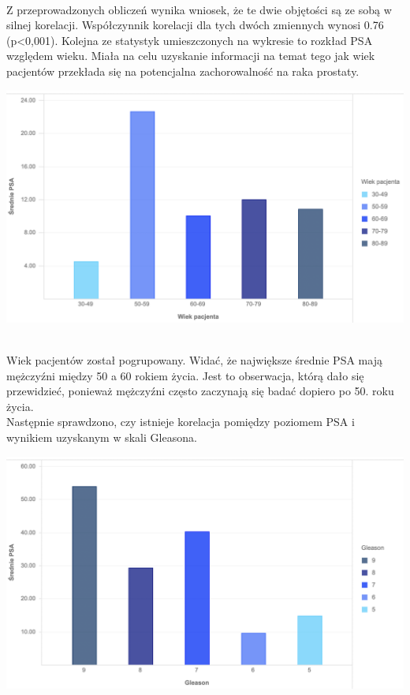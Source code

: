 \documentclass[a4paper,11pt,twoside]{report}
\theoremstyle{definition}
\begin{document}
\\ \newline
Z przeprowadzonych obliczeń wynika wniosek, że te dwie objętości są ze sobą w silnej korelacji. Współczynnik korelacji dla tych dwóch zmiennych wynosi 0.76 (p<0,001).
\newline \newline 
Kolejna ze statystyk umieszczonych na wykresie to rozkład PSA względem wieku. Miała na celu uzyskanie informacji na temat tego jak wiek pacjentów przekłada się na potencjalna zachorowalność na raka prostaty.
\\
\begin{minipage}[h]{\linewidth}
	\centering
	\includegraphics[width=\textwidth]{Wykresy/AgePSA.png}
\end{minipage}
\\
Wiek pacjentów został pogrupowany. Widać, że największe średnie PSA mają mężczyźni między 50 a 60 rokiem życia. Jest to obserwacja, którą dało się przewidzieć, ponieważ mężczyźni często zaczynają się badać dopiero po 50. roku życia. 
\\ \newline
Następnie sprawdzono, czy istnieje korelacja pomiędzy poziomem PSA i wynikiem uzyskanym w skali Gleasona.
\\
\begin{minipage}[h]{\linewidth}
	\centering
	\includegraphics[width=\textwidth]{Wykresy/PSAGleason.png}
\end{minipage}
\end{document}
